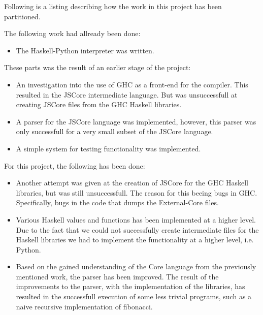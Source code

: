Following is a listing describing how the work in this project has been
partitioned.

The following work had allready been done:
\begin{itemize}

\item The Haskell-Python\cite{haskellpython} interpreter was written.

\end{itemize}

These parts was the result of an earlier stage of the project:
\begin{itemize}

\item An investigation into the use of GHC as a front-end for the compiler.
This resulted in the JSCore intermediate language. But was unsuccessfull
at creating JSCore files from the GHC Haskell libraries.

\item A parser for the JSCore language was implemented, however, this 
parser was only successfull for a very small subset of the JSCore language.

\item A simple system for testing functionality was implemented.

\end{itemize}

For this project, the following has been done:
\begin{itemize}

\item Another attempt was given at the creation of JSCore for the GHC 
Haskell libraries, but was still unsuccessfull. The reason for this beeing
bugs in GHC. Specifically, bugs in the code that dumps the External-Core
files.

\item Various Haskell values and functions has been implemented at a higher
level. Due to the fact that we could not successfully create intermediate
files for the Haskell
libraries we had to implement the functionality at a higher level, i.e. 
Python.

\item Based on the gained understanding of the Core language from the
previously mentioned work, the parser has been improved. The result of 
the improvements to the parser, with the implementation of the libraries,
has resulted in the successfull execution of some less trivial programs,
such as a naive recursive implementation of fibonacci.

\end{itemize}


